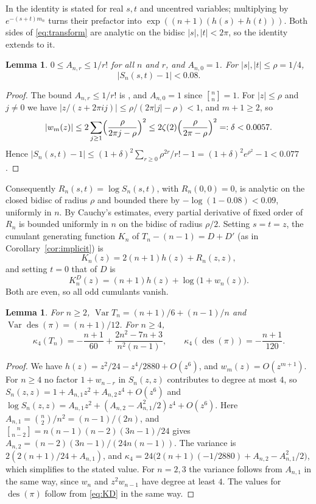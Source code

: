 \documentclass[11pt]{amsart}
\newtheorem{lemma}[theorem]{Lemma}
\theoremstyle{remark}
\newcommand{\des}{\operatorname{des}}
\newcommand{\stirl}[2]{\genfrac{[}{]}{0pt}{}{#1}{#2}}
\begin{document}
In \cite{BBFR24} the identity is stated for real $s,t$ and uncentred variables; multiplying by $e^{-(s+t)m_n}$ turns their prefactor into $\exp((n+1)(h(s)+h(t)))$. Both sides of \eqref{eq:transform} are analytic on the bidisc $|s|,|t|<2\pi$, so the identity extends to it.

\begin{lemma}\label{lem:bound}
$0\le A_{n,r}\le1/r!$ for all $n$ and $r$, and $A_{n,0}=1$. For $|s|,|t|\le\rho=1/4$,
\[
|S_n(s,t)-1|<0.08.
\]
\end{lemma}

\begin{proof}
The bound $A_{n,r}\le1/r!$ is \cite[Lemma~6.2]{BBFR24}, and $A_{n,0}=1$ since $\stirl nn=1$. For $|z|\le\rho$ and $j\ne0$ we have $|z/(z+2\pi ij)|\le\rho/(2\pi|j|-\rho)<1$, and $m+1\ge2$, so
\[
|w_m(z)|\le2\sum_{j\ge1}\Bigl(\frac{\rho}{2\pi j-\rho}\Bigr)^2\le2\zeta(2)\Bigl(\frac{\rho}{2\pi-\rho}\Bigr)^2=:\delta<0.0057.
\]
Hence $|S_n(s,t)-1|\le(1+\delta)^2\sum_{r\ge0}\rho^{2r}/r!-1=(1+\delta)^2e^{\rho^2}-1<0.077$.
\end{proof}

Consequently $R_n(s,t)=\log S_n(s,t)$, with $R_n(0,0)=0$, is analytic on the closed bidisc of radius $\rho$ and bounded there by $-\log(1-0.08)<0.09$, uniformly in $n$. By Cauchy's estimates, every partial derivative of fixed order of $R_n$ is bounded uniformly in $n$ on the bidisc of radius $\rho/2$. Setting $s=t=z$, the cumulant generating function $K_n$ of $T_n-(n-1)=D+D'$ (as in Corollary~\ref{cor:implicit}) is
\begin{equation}\label{eq:K}
K_n(z)=2(n+1)h(z)+R_n(z,z),
\end{equation}
and setting $t=0$ that of $D$ is
\begin{equation}\label{eq:KD}
K_n^{D}(z)=(n+1)h(z)+\log\bigl(1+w_n(z)\bigr).
\end{equation}
Both are even, so all odd cumulants vanish.

\begin{lemma}\label{lem:cumulants}
For $n\ge2$, $\operatorname{Var}T_n=(n+1)/6+(n-1)/n$ \cite{CD17} and $\operatorname{Var}\des(\pi)=(n+1)/12$. For $n\ge4$,
\[
\kappa_4(T_n)=-\frac{n+1}{60}+\frac{2n^2-7n+3}{n^2(n-1)},\qquad \kappa_4(\des(\pi))=-\frac{n+1}{120}.
\]
\end{lemma}

\begin{proof}
We have $h(z)=z^2/24-z^4/2880+O(z^6)$, and $w_m(z)=O(z^{m+1})$. For $n\ge4$ no factor $1+w_{n-r}$ in $S_n(z,z)$ contributes to degree at most $4$, so $S_n(z,z)=1+A_{n,1}z^2+A_{n,2}z^4+O(z^6)$ and $\log S_n(z,z)=A_{n,1}z^2+(A_{n,2}-A_{n,1}^2/2)z^4+O(z^6)$. Here $A_{n,1}=\binom n2/n^2=(n-1)/(2n)$, and $\stirl{n}{n-2}=n(n-1)(n-2)(3n-1)/24$ gives $A_{n,2}=(n-2)(3n-1)/(24n(n-1))$. The variance is $2(2(n+1)/24+A_{n,1})$, and $\kappa_4=24\bigl(2(n+1)(-1/2880)+A_{n,2}-A_{n,1}^2/2\bigr)$, which simplifies to the stated value. For $n=2,3$ the variance follows from $A_{n,1}$ in the same way, since $w_{n}$ and $z^2w_{n-1}$ have degree at least $4$. The values for $\des(\pi)$ follow from \eqref{eq:KD} in the same way.
\end{proof}
\end{document}
